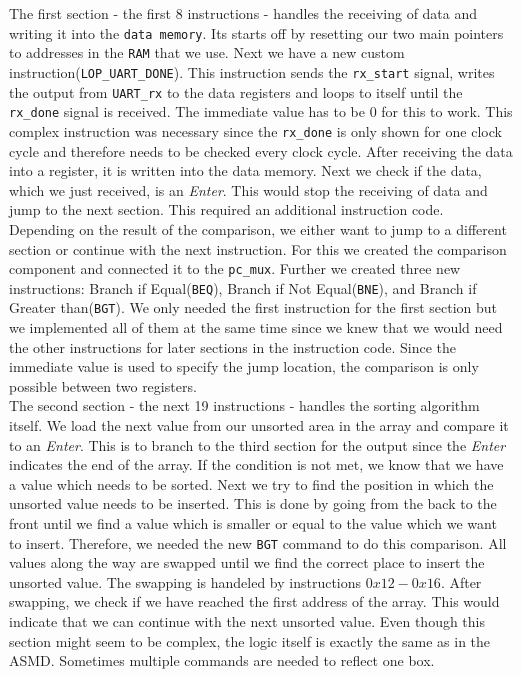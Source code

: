 \documentclass[conference]{IEEEtran}
\begin{document}
The first section - the first 8 instructions - handles the receiving of data and writing it into the \texttt{data memory}. Its starts off by resetting our two main pointers to addresses in the \texttt{RAM} that we use. Next we have a new custom instruction(\texttt{LOP\_UART\_DONE}). This instruction sends the \texttt{rx\_start} signal, writes the output from \texttt{UART\_rx} to the data registers and loops to itself until the \texttt{rx\_done} signal is received. The immediate value has to be 0 for this to work. This complex instruction was necessary since the \texttt{rx\_done} is only shown for one clock cycle and therefore needs to be checked every clock cycle. After receiving the data into a register, it is written into the data memory. Next we check if the data, which we just received, is an \textit{Enter}. This would stop the receiving of data and jump to the next section. This required an additional instruction code. Depending on the result of the comparison, we either want to jump to a different section or continue with the next instruction. For this we created the comparison component and connected it to the \texttt{pc\_mux}. Further we created three new instructions: Branch if Equal(\texttt{BEQ}), Branch if Not Equal(\texttt{BNE}), and Branch if Greater than(\texttt{BGT}). We only needed the first instruction for the first section but we implemented all of them at the same time since we knew that we would need the other instructions for later sections in the instruction code. Since the immediate value is used to specify the jump location, the comparison is only possible between two registers.\\
The second section - the next 19 instructions - handles the sorting algorithm itself. We load the next value from our unsorted area in the array and compare it to an \textit{Enter}. This is to branch to the third section for the output since the \textit{Enter} indicates the end of the array. If the condition is not met, we know that we have a value which needs to be sorted. Next we try to find the position in which the unsorted value needs to be inserted. This is done by going from the back to the front until we find a value which is smaller or equal to the value which we want to insert. Therefore, we needed the new \texttt{BGT} command to do this comparison. All values along the way are swapped until we find the correct place to insert the unsorted value. The swapping is handeled by instructions $0x12-0x16$. After swapping, we check if we have reached the first address of the array. This would indicate that we can continue with the next unsorted value. Even though this section might seem to be complex, the logic itself is exactly the same as in the ASMD. Sometimes multiple commands are needed to reflect one box.\\
\end{document}
